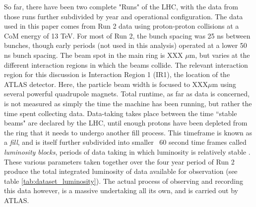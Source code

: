     So far, there have been two complete "Runs" of the LHC, with the data from those runs further subdivided by year and operational configuration.
    The data used in this paper comes from Run 2 data using proton-proton collisions at a CoM energy of 13 TeV.
    For most of Run 2, the bunch spacing was 25 ns between bunches, though early periods (not used in this analysis) operated at a lower 50 ns bunch spacing.
    The beam spot in the main ring is XXX $\mu$m, but varies at the different interaction regions in which the beams collide.
    The relevant interaction region for this discussion is Interaction Region 1 (IR1), the location of the ATLAS detector.
    Here, the particle beam width is focused to XXX$\mu$m using several powerful quadrupole magnets.
    Total runtime, as far as data is concerned, is not measured as simply the time the machine has been running, but rather the time spent collecting data.
    Data-taking takes place between the time ``stable beams" are declared by the LHC, until enough protons have been depleted from the ring that it needs to undergo another fill process.
    This timeframe is known as a \textit{fill}, and is itself further subdivided into smaller ~60 second time frames called \textit{luminosity blocks}, periods of data taking in which luminosity is relatively stable \cite{data_quality}.
    These various parameters taken together over the four year period of Run 2 produce the total integrated luminosity of data available for observation (see table \ref{tab:dataset_luminosity}).
    The actual process of observing and recording this data however, is a massive undertaking all its own, and is carried out by ATLAS.
